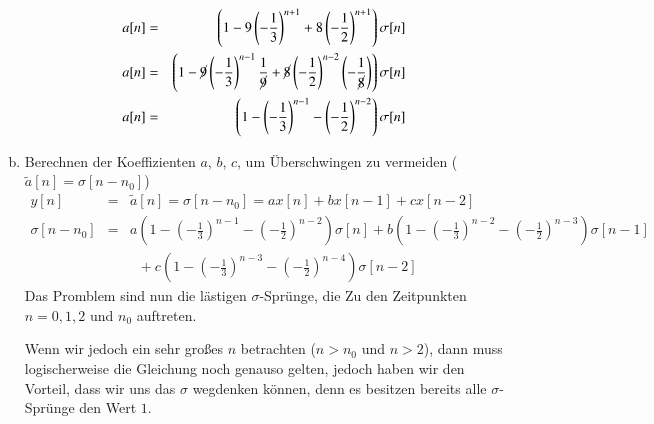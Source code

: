 \begin{uebsp}
\begin{Answer}
\begin{enumerate}[a)]
\begin{eqnarray*}
        a[n]&=&\left(1-9\left(-\frac{1}{3}\right)^{n+1}
            +8\left(-\frac{1}{2}\right)^{n+1}\right)\sigma[n]\\
        a[n]&=&\left(1-\cancel9\left(-\frac{1}{3}\right)^{n-1}\frac{1}{\cancel9}
            +\cancel8\left(-\frac{1}{2}\right)^{n-2}\left(-\frac{1}{\cancel8}\right)\right)\sigma[n]\\
        a[n]&=&\left(1-\left(-\frac{1}{3}\right)^{n-1}
            -\left(-\frac{1}{2}\right)^{n-2}\right)\sigma[n]
    \end{eqnarray*}
        \def\lbl{$a[n]=(1-\left(-\frac{1}{3}\right)^{n-1}
            -\left(-\frac{1}{2}\right)^{n-2})\sigma[n]$}
        \begin{center}
        \end{center}
        \item Berechnen der Koeffizienten $a$, $b$, $c$, um Überschwingen zu
        vermeiden ($\tilde a[n]=\sigma[n-n_0]$)
        {\footnotesize
        \begin{eqnarray*}
            y[n]&=&\tilde a[n]=\sigma[n-n_0]=ax[n]+bx[n-1]+cx[n-2]\\
            \sigma[n-n_0]&=&a\left(1-\left(-\frac{1}{3}\right)^{n-1}-\left(-\frac{1}{2}\right)^{n-2}\right)\sigma[n]
                +b\left(1-\left(-\frac{1}{3}\right)^{n-2}-\left(-\frac{1}{2}\right)^{n-3}\right)\sigma[n-1]\\
                &&\;\;+c\left(1-\left(-\frac{1}{3}\right)^{n-3}-\left(-\frac{1}{2}\right)^{n-4}\right)\sigma[n-2]
        \end{eqnarray*}}
        Das Promblem sind nun die lästigen $\sigma$-Sprünge, die Zu den
        Zeitpunkten $n=0,1,2$ und $n_0$ auftreten. 

        Wenn wir jedoch ein sehr großes $n$ betrachten ($n>n_0$ und $n>2$), dann
        muss logischerweise die Gleichung noch genauso gelten, jedoch haben wir
        den Vorteil, dass wir uns das $\sigma$ wegdenken können, denn es
        besitzen bereits alle $\sigma$-Sprünge den Wert $1$.


\end{enumerate}
\end{Answer}
\end{uebsp}
